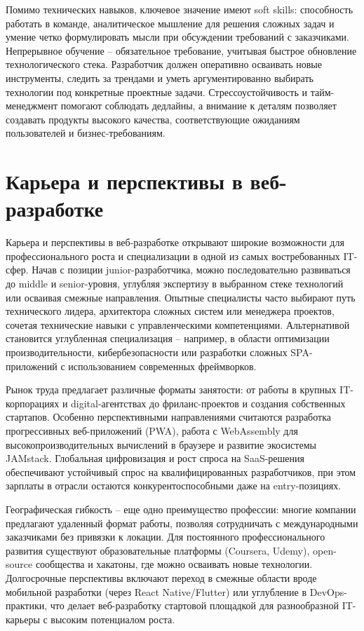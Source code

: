 \documentclass[referat]{SCWorks}
\begin{document}
Помимо технических навыков, ключевое значение имеют soft skills: способность работать в команде, аналитическое мышление для решения сложных задач и умение четко формулировать мысли при обсуждении требований с заказчиками. Непрерывное обучение -- обязательное требование, учитывая быстрое обновление технологического стека. Разработчик должен оперативно осваивать новые инструменты, следить за трендами и уметь аргументированно выбирать технологии под конкретные проектные задачи. Стрессоустойчивость и тайм-менеджмент помогают соблюдать дедлайны, а внимание к деталям позволяет создавать продукты высокого качества, соответствующие ожиданиям пользователей и бизнес-требованиям.\cite{web_dev_2024}

\section{Карьера и перспективы в веб-разработке}

Карьера и перспективы в веб-разработке открывают широкие возможности для профессионального роста и специализации в одной из самых востребованных IT-сфер. Начав с позиции junior-разработчика, можно последовательно развиваться до middle и senior-уровня, углубляя экспертизу в выбранном стеке технологий или осваивая смежные направления. Опытные специалисты часто выбирают путь технического лидера, архитектора сложных систем или менеджера проектов, сочетая технические навыки с управленческими компетенциями. Альтернативой становится углубленная специализация -- например, в области оптимизации производительности, кибербезопасности или разработки сложных SPA-приложений с использованием современных фреймворков.\cite{fullstack_guide}

Рынок труда предлагает различные форматы занятости: от работы в крупных IT-корпорациях и digital-агентствах до фриланс-проектов и создания собственных стартапов. Особенно перспективными направлениями считаются разработка прогрессивных веб-приложений (PWA), работа с WebAssembly для высокопроизводительных вычислений в браузере и развитие экосистемы JAMstack. Глобальная цифровизация и рост спроса на SaaS-решения обеспечивают устойчивый спрос на квалифицированных разработчиков, при этом зарплаты в отрасли остаются конкурентоспособными даже на entry-позициях.\cite{web_dev_2024}

Географическая гибкость -- еще одно преимущество профессии: многие компании предлагают удаленный формат работы, позволяя сотрудничать с международными заказчиками без привязки к локации. Для постоянного профессионального развития существуют образовательные платформы (Coursera, Udemy), open-source сообщества и хакатоны, где можно осваивать новые технологии.\cite{mdn_web_docs} Долгосрочные перспективы включают переход в смежные области вроде мобильной разработки (через React Native/Flutter) или углубление в DevOps-практики, что делает веб-разработку стартовой площадкой для разнообразной IT-карьеры с высоким потенциалом роста.\cite{web_architecture}
\end{document}
